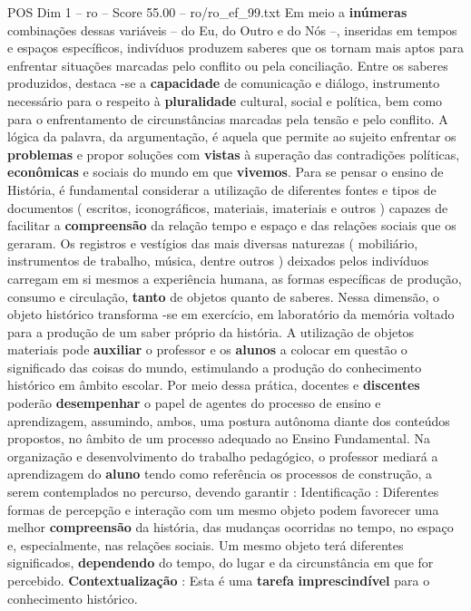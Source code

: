 \begin{textsample}{POS Dim 1 – ro – Score 55.00 – ro/ro\_ef\_99.txt}
Em meio a \textbf{inúmeras} combinações dessas variáveis – do Eu, do Outro e do Nós –, inseridas em tempos e espaços específicos, indivíduos produzem saberes que os tornam mais aptos para enfrentar situações marcadas pelo conflito ou pela conciliação.
Entre os saberes produzidos, destaca -se a \textbf{capacidade} de comunicação e diálogo, instrumento necessário para o respeito à \textbf{pluralidade} cultural, social e política, bem como para o enfrentamento de circunstâncias marcadas pela tensão e pelo conflito.
A lógica da palavra, da argumentação, é aquela que permite ao sujeito enfrentar os \textbf{problemas} e propor soluções com \textbf{vistas} à superação das contradições políticas, \textbf{econômicas} e sociais do mundo em que \textbf{vivemos}.
Para se pensar o ensino de História, é fundamental considerar a utilização de diferentes fontes e tipos de documentos ( escritos, iconográficos, materiais, imateriais e outros ) capazes de facilitar a \textbf{compreensão} da relação tempo e espaço e das relações sociais que os geraram.
Os registros e vestígios das mais diversas naturezas ( mobiliário, instrumentos de trabalho, música, dentre outros ) deixados pelos indivíduos carregam em si mesmos a experiência humana, as formas específicas de produção, consumo e circulação, \textbf{tanto} de objetos quanto de saberes.
Nessa dimensão, o objeto histórico transforma -se em exercício, em laboratório da memória voltado para a produção de um saber próprio da história.
A utilização de objetos materiais pode \textbf{auxiliar} o professor e os \textbf{alunos} a colocar em questão o significado das coisas do mundo, estimulando a produção do conhecimento histórico em âmbito escolar.
Por meio dessa prática, docentes e \textbf{discentes} poderão \textbf{desempenhar} o papel de agentes do processo de ensino e aprendizagem, assumindo, ambos, uma postura autônoma diante dos conteúdos propostos, no âmbito de um processo adequado ao Ensino Fundamental.
Na organização e desenvolvimento do trabalho pedagógico, o professor mediará a aprendizagem do \textbf{aluno} tendo como referência os processos de construção, a serem contemplados no percurso, devendo garantir : Identificação : Diferentes formas de percepção e interação com um mesmo objeto podem favorecer uma melhor \textbf{compreensão} da história, das mudanças ocorridas no tempo, no espaço e, especialmente, nas relações sociais.
Um mesmo objeto terá diferentes significados, \textbf{dependendo} do tempo, do lugar e da circunstância em que for percebido. \textbf{Contextualização} : Esta é uma \textbf{tarefa} \textbf{imprescindível} para o conhecimento histórico.

\end{textsample}
